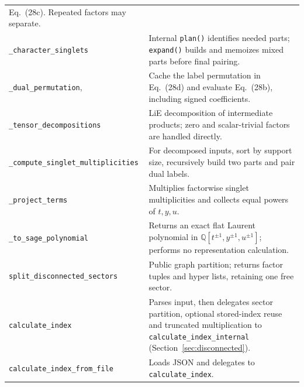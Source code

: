 \documentclass[11pt,a4paper]{article}
\newcommand{\code}[1]{{\small\nolinkurl{#1}}}
\begin{document}
\begin{tabularx}{\textwidth}{@{}p{65mm}Y@{}}
Eq.~(28c). Repeated factors may separate.\\
\code{_character_singlets} & Internal \code{plan()} identifies needed parts;
\code{expand()} builds and memoizes mixed parts before final pairing.\\
\code{_dual_permutation},\newline\code{_singlet_pair} & Cache the label permutation
in Eq.~(28d) and evaluate Eq.~(28b), including signed coefficients.\\
\code{_tensor_decompositions} & LiE decomposition of intermediate products;
zero and scalar-trivial factors are handled directly.\\
\code{_compute_singlet_multiplicities} & For decomposed inputs, sort by support
size, recursively build two parts and pair dual labels.\\
\code{_project_terms} & Multiplies factorwise singlet multiplicities and collects
equal powers of $t,y,u$.\\
\code{_to_sage_polynomial} & Returns an exact flat Laurent polynomial in
$\mathbb Q[t^{\pm1},y^{\pm1},u^{\pm1}]$; performs no representation calculation.\\
\code{split_disconnected_sectors} & Public graph partition; returns factor tuples
and hyper lists, retaining one free sector.\\
\code{calculate_index} & Parses input, then delegates sector partition,
optional stored-index reuse and truncated multiplication to
\code{calculate_index_internal} (Section~\ref{sec:disconnected}).\\
\code{calculate_index_from_file} & Loads JSON and delegates to \code{calculate_index}.\\\bottomrule
\end{tabularx}

\clearpage
\end{document}
